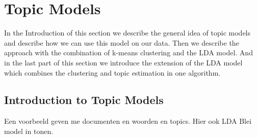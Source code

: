 \documentclass[11pt,a4paper]{article}
\begin{document}
% 
% 
\pagebreak
\section{Topic Models}
In the Introduction of this section we describe the general idea of topic models and describe how we can use this model on our data. Then we describe the approach with the combination of k-means clustering and the LDA model. And in the last part of this section we introduce the extension of the LDA model which combines the clustering and topic estimation in one algorithm.

\subsection{Introduction to Topic Models}
Een voorbeeld geven me documenten en woorden en topics. Hier ook LDA Blei model in tonen.
\end{document}

